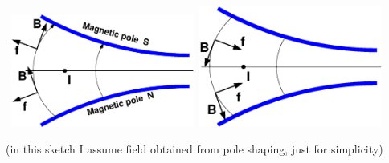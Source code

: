 \documentclass[12pt]{article}
\begin{document}
{{\begin{minipage}[b]{.5\linewidth}
\mbox{\hspace{3mm}
\includegraphics*[bbllx=0,bblly=0,bburx=300,bbury=254,width=6cm]{./figs_FFAG_introSlides/fFoc.eps}  \hspace{5mm}
\includegraphics*[bbllx=0,bblly=0,bburx=300,bbury=254,width=6cm]{./figs_FFAG_introSlides/dFoc.eps}
}

(in this sketch I assume field obtained from pole shaping, just for simplicity)


\end{minipage}
}

}%







\clearpage 
\end{document}
